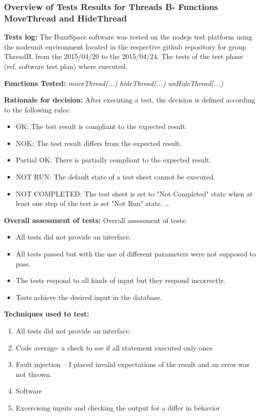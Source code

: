 \begin{flushleft}
\begin{flushleft}
\end{flushleft}

\subsubsection{Overview of Tests Results for Threads B- Functions MoveThread and HideThread}
\begin{flushleft}
\textbf{Tests log:}
The BuzzSpace software was tested on the nodejs test platform using the nodeunit environment located in the respective github repository for group ThreadB, from the 2015/04/20 to the 2015/04/24. The tests of the test phase (ref. software test plan) where executed.


\textbf{Functions Tested:}
\emph{moveThread(...)} 
\emph{hideThread(...)} 
\emph{unHideThread(...)} 

\textbf{Rationale for decision:}
After executing a test, the decision is defined according to the following rules:
\begin{itemize}
  	\item OK: The test result is compliant to the expected result.
  	\item 	NOK: The test result differs from the expected result.
   	\item Partial OK: There is partially compliant to the expected result. 
    	\item NOT RUN: The default state of a test sheet cannot be executed.
  	\item NOT COMPLETED: The test sheet is set to "Not Completed" state when at least one step of the test is set "Not Run" state. \ldots
\end{itemize}

\textbf{Overall assessment of tests:}
Overall assessment of tests:
\begin{itemize}
	\item All tests did not provide an interface.
	\item 	All tests passed but with the use of different parameters were not supposed to pass.
	\item The tests respond to all kinds of input but they respond incorrectly.
	\item Tests achieve the desired input in the database. 
 \end{itemize}

\textbf{Techniques used to test:}
\begin{enumerate}
  	\item All tests did not provide an interface.
  	\item Code average- a check to see if all statement executed only once
   	\item Fault injection – I placed invalid expectations of the result and an error was not thrown.
    	\item Software 
    	\item Excercising inputs and checking the output for a differ in behavior
 \end{enumerate}


\end{flushleft}
\end{flushleft}
